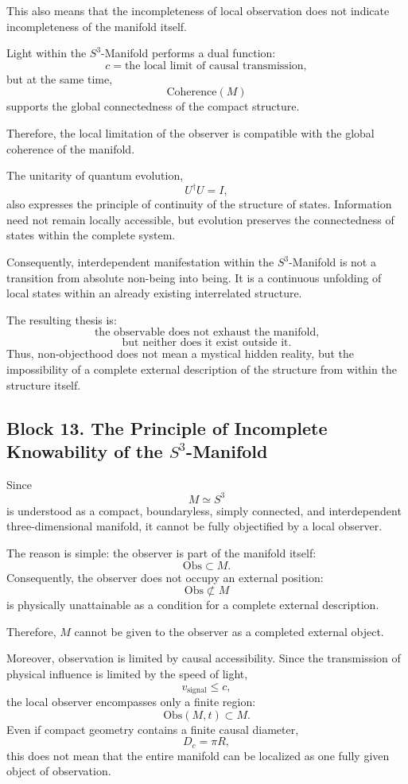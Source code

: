 \documentclass[12pt,a4paper]{article}
\theoremstyle{definition}
\begin{document}
This also means that the incompleteness of local observation does not indicate incompleteness of the manifold itself.

Light within the \(S^3\)-Manifold performs a dual function:
\[
c=\text{the local limit of causal transmission},
\]
but at the same time,
\[
\mathrm{Coherence}(M)
\]
supports the global connectedness of the compact structure.

Therefore, the local limitation of the observer is compatible with the global coherence of the manifold.

The unitarity of quantum evolution,
\[
U^\dagger U=I,
\]
also expresses the principle of continuity of the structure of states. Information need not remain locally accessible, but evolution preserves the connectedness of states within the complete system.

Consequently, interdependent manifestation within the \(S^3\)-Manifold is not a transition from absolute non-being into being. It is a continuous unfolding of local states within an already existing interrelated structure.

The resulting thesis is:
\[
\text{the observable does not exhaust the manifold,}
\]
\[
\text{but neither does it exist outside it.}
\]
Thus, non-objecthood does not mean a mystical hidden reality, but the impossibility of a complete external description of the structure from within the structure itself.



\subsection{Block 13. The Principle of Incomplete Knowability of the \(S^3\)-Manifold}
Since
\[
M\simeq S^3
\]
is understood as a compact, boundaryless, simply connected, and interdependent three-dimensional manifold, it cannot be fully objectified by a local observer.

The reason is simple: the observer is part of the manifold itself:
\[
\mathrm{Obs}\subset M.
\]
Consequently, the observer does not occupy an external position:
\[
\mathrm{Obs}\not\subset M
\]
is physically unattainable as a condition for a complete external description.

Therefore, \(M\) cannot be given to the observer as a completed external object.

Moreover, observation is limited by causal accessibility. Since the transmission of physical influence is limited by the speed of light,
\[
v_{\mathrm{signal}}\leq c,
\]
the local observer encompasses only a finite region:
\[
\mathrm{Obs}(M,t)\subset M.
\]
Even if compact geometry contains a finite causal diameter,
\[
D_c=\pi R,
\]
this does not mean that the entire manifold can be localized as one fully given object of observation.
\end{document}
